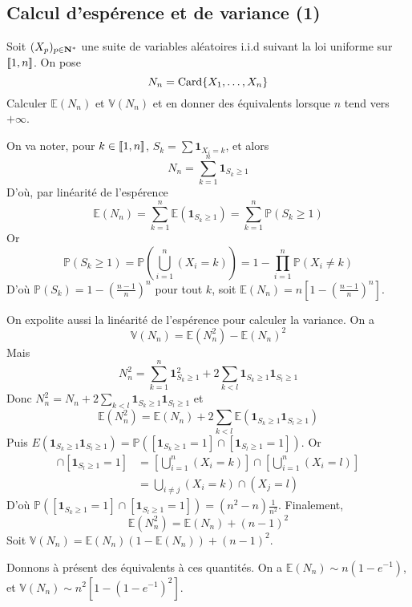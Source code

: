 \subsection{Calcul d'espérence et de variance (1)}
\begin{exercice}
    Soit $(X_p)_{p\in\operatorname{\mathbf{N}}^*}$ une suite de variables aléatoires i.i.d suivant la loi uniforme sur $[\![1,n]\!]$.
    On pose 
    \[
        N_n=\operatorname{Card}\lbrace X_1,\dots,X_n\rbrace  
    \]
    Calculer $\mathbb E(N_n)$ et $\mathbb V(N_n)$ et en donner des équivalents lorsque $n$ tend vers $+\infty$.
\end{exercice}

\begin{correction}
    On va noter, pour $k\in[\![1,n]\!]$, $S_k=\sum\mathbf1_{X_i=k}$, et alors
    \[
        N_n=\sum_{k=1}^n\mathbf1_{S_k\geq 1}    
    \]
    D'où, par linéarité de l'espérence 
    \[
        \mathbb E(N_n)=\sum_{k=1}^n\mathbb E(\mathbf1_{S_k\geq 1})=\sum_{k=1}^n\mathbb P(S_k\geq 1)
    \]
    Or
    \[
        \mathbb P(S_k\geq 1)=\mathbb P\left(\bigcup_{i=1}^n(X_i=k)\right)=1-\prod_{i=1}^n\mathbb P(X_i\neq k)    
    \]
    D'où $\mathbb P(S_k)=1-\left(\frac{n-1}n\right)^n$ pour tout $k$, soit $\mathbb E(N_n)=n\left[1-\left(\frac{n-1}n\right)^n\right]$.

    On expolite aussi la linéarité de l'espérence pour calculer la variance. 
    On a 
    \[
        \mathbb V(N_n)=\mathbb E(N_n^2)-\mathbb E(N_n)^2    
    \]
    Mais 
    \[
        N_n^2=\sum_{k=1}^n\mathbf1_{S_k\geq 1}^2+2\sum_{k<l}\mathbf1_{S_k\geq 1}\mathbf1_{S_l\geq 1}
    \]
    Donc $N_n^2=N_n+2\sum_{k<l}\mathbf1_{S_k\geq 1}\mathbf1_{S_l\geq 1}$ et 
    \[
        \mathbb E(N_n^2)=\mathbb E(N_n)+2\sum_{k<l}\mathbb E(\mathbf1_{S_k\geq 1}\mathbf1_{S_l\geq 1})
    \]
    Puis $E(\mathbf1_{S_k\geq 1}\mathbf1_{S_l\geq 1})=\mathbb P([\mathbf1_{S_k\geq 1}=1]\cap [\mathbf1_{S_l\geq 1}=1])$. 
    Or
    \begin{align*}
        [\mathbf1_{S_k\geq 1}=1]\cap [\mathbf1_{S_l\geq 1}=1]&=\left[\bigcup_{i=1}^n(X_i=k)\right]\cap\left[\bigcup_{i=1}^n(X_i=l)\right]\\
                                                             &=\bigcup_{i\neq j}(X_i=k)\cap(X_j=l)
    \end{align*}
    D'où $\mathbb P([\mathbf1_{S_k\geq 1}=1]\cap [\mathbf1_{S_l\geq 1}=1])=(n^2-n)\frac1{n^2}$.
    Finalement,
    \[
        \mathbb E(N_n^2)=\mathbb E(N_n)+(n-1)^2
    \]
    Soit $\mathbb V(N_n)=\mathbb E(N_n)(1-\mathbb E(N_n)) + (n-1)^2$.

    Donnons à présent des équivalents à ces quantités. 
    On a $\mathbb E(N_n)\sim n(1-e^{-1})$, et $\mathbb V(N_n)\sim n^2[1-(1-e^{-1})^2]$.
\end{correction}

